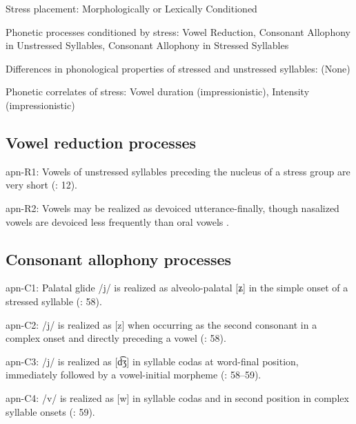 {\begin{appendixdesc}
\item[Stress placement:] Morphologically or Lexically Conditioned

\item[Phonetic processes conditioned by stress:] Vowel Reduction, Consonant Allophony in Unstressed Syllables, Consonant Allophony in Stressed Syllables

\item[Differences in phonological properties of stressed and unstressed syllables:] (None)

\item[Phonetic correlates of stress:] Vowel duration (impressionistic), Intensity (impressionistic)
\end{appendixdesc}
\subsection*{Vowel reduction processes}
\begin{appendixdesc}

\item[apn-R1:] Vowels of unstressed syllables preceding the nucleus of a stress group are very short (\citealt{BurgessHam1968}: 12).

\item[apn-R2:] Vowels may be realized as devoiced utterance-finally, though nasalized vowels are devoiced less frequently than oral vowels \citep[7]{Ham2009}.
\end{appendixdesc}
\subsection*{Consonant allophony processes}
\begin{appendixdesc}

\item[apn-C1:] Palatal glide /j/ is realized as alveolo-palatal [ʑ] in the simple onset of a stressed syllable (\citealt{CunhadeOliveira2005}: 58).

\item[apn-C2:] /j/ is realized as [z] when occurring as the second consonant in a complex onset and directly preceding a vowel (\citealt{CunhadeOliveira2005}: 58).

\item[apn-C3:] /j/ is realized as [d͡ʒ] in syllable codas at word-final position, immediately followed by a vowel-initial morpheme (\citealt{CunhadeOliveira2005}: 58--59).

\item[apn-C4:] /v/ is realized as [w] in syllable codas and in second position in complex syllable onsets (\citealt{CunhadeOliveira2005}: 59).


\end{appendixdesc}}
